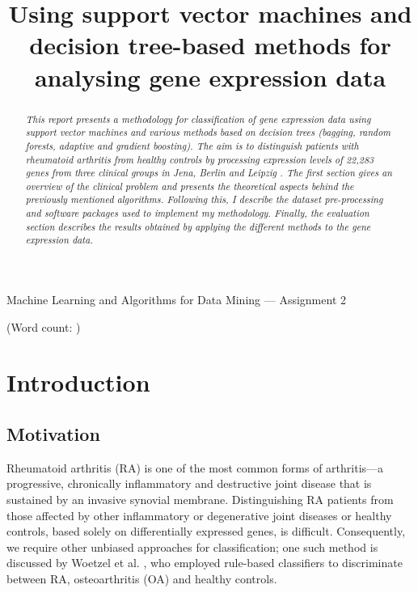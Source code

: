 \documentclass[11pt]{article}
\numberwithin{equation}{section}
\begin{document}
\date{}
\title{\huge \bf{Using support vector machines and\\ decision tree-based methods for\\ analysing gene expression data}}\maketitle
\centerline{\Large {Machine Learning and Algorithms for Data Mining --- Assignment 2}}
\vspace{1em}
\centerline{(Word count: )}
\vspace{2em}

\begin{abstract}
\noindent
\textit{This report presents a methodology for classification of gene expression data using support vector machines and various methods based on decision trees (bagging, random forests, adaptive and gradient boosting). The aim is to distinguish patients with rheumatoid arthritis from healthy controls by processing expression levels of 22,283 genes from three clinical groups in Jena, Berlin and Leipzig \cite{woetzel2014}. The first section gives an overview of the clinical problem and presents the theoretical aspects behind the previously mentioned algorithms. Following this, I describe the dataset pre-processing and software packages used to implement my methodology. Finally, the evaluation section describes the results obtained by applying the different methods to the gene expression data.}
\end{abstract}

\section{Introduction}

\subsection{Motivation}

Rheumatoid arthritis (RA) is one of the most common forms of arthritis---a progressive, chronically inflammatory and destructive joint disease that is sustained by an invasive synovial membrane. Distinguishing RA patients from those affected by other inflammatory or degenerative joint diseases or healthy controls, based solely on differentially expressed genes, is difficult. Consequently, we require other unbiased approaches for classification; one such method is discussed by Woetzel et al. \cite{woetzel2014}, who employed rule-based classifiers to discriminate between RA, osteoarthritis (OA) and healthy controls. 
\end{document}
